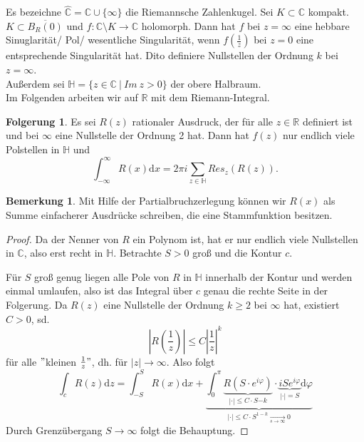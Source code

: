 \documentclass[11pt,titlepage]{article}
\theoremstyle{definition}
\newtheorem{corollary}[theorem]{Folgerung}
\newtheorem{remark}[theorem]{Bemerkung}
\theoremstyle{remark}
\begin{document}
	Es bezeichne $\hat{\mathbb{C}}=\mathbb{C}\cup \{\infty\}$ die Riemannsche Zahlenkugel. Sei 
	$K\subset\mathbb{C}$ kompakt. $K\subset \overline{B_R(0)}$ und $f:\mathbb{C}\setminus K\to 
	\mathbb{C}$ holomorph. Dann hat $f$ bei $z=\infty$ eine hebbare Sinuglarität/ Pol/ wesentliche 
	Singularität, wenn $f(\frac{1}{z})$ bei $z=0$ eine entsprechende Singularität hat. Dito definiere 
	Nullstellen der Ordnung $k$ bei $z=\infty$.\\
	Außerdem sei $\mathbb{H} =\{ z\in\mathbb{C} \ \vert\ Im\  z>0 \}$ der obere Halbraum. \\
	Im Folgenden arbeiten wir auf $\mathbb{R}$ mit dem Riemann-Integral.
	
	\begin{corollary}
		Es sei $R(z)$ rationaler Ausdruck, der für alle $z\in\mathbb{R}$ definiert ist und bei $\infty$ eine 
		Nullstelle der Ordnung 2 hat. Dann hat $f(z)$ nur endlich viele Polstellen in $\mathbb{H}$ und 
		\[ \int_{-\infty}^{\infty} R(x)\mathrm{d}x =2\pi i \sum_{z\in\mathbb{H}} Res_z(R(z)). \]
	\end{corollary}
	
	\begin{remark}
		Mit Hilfe der Partialbruchzerlegung können wir $R(x)$ als Summe einfacherer Ausdrücke schreiben, 
		die eine Stammfunktion besitzen.
	\end{remark}
	
	\begin{proof}
		Da der Nenner von $R$ ein Polynom ist, hat er nur endlich viele Nullstellen in $\mathbb{C}$, also 
		erst recht in $\mathbb{H}$. Betrachte $S>0$ groß und die Kontur $c$.
		
		
		Für $S$ groß genug liegen alle Pole von $R$ in $\mathbb{H}$ innerhalb der Kontur und werden 
		einmal umlaufen, also ist das Integral über $c$ genau die rechte Seite in der Folgerung. Da $R(z)$ 
		eine Nullstelle der Ordnung $k\geq 2$ bei $\infty$ hat, existiert $C>0$, sd.
		\[ \left|R\left(\frac{1}{z}\right)\right|\leq C\left|\frac{1}{z}\right|^k \]
		für alle $"$kleinen $\frac{1}{z}"$, dh. für $|z|\to \infty$. Also folgt 
		\[ \int_c R(z)\mathrm{d}z=\int_{-S}^S R(x)\mathrm{d}x + \underbrace{\int_0^{\pi} \underbrace{
		R(S\cdot e^{i\varphi})}_{|\cdot|\leq C\cdot S{-k}}\cdot \underbrace{iSe^{i\varphi}}_{|\cdot|=S}\mathrm{d}
		\varphi}_{|\cdot|\leq C\cdot S^{1-k} \underset{s\to\infty}{\to}0} \]
		Durch Grenzübergang $S\to \infty$ folgt die Behauptung.
	\end{proof}
	
\end{document}
